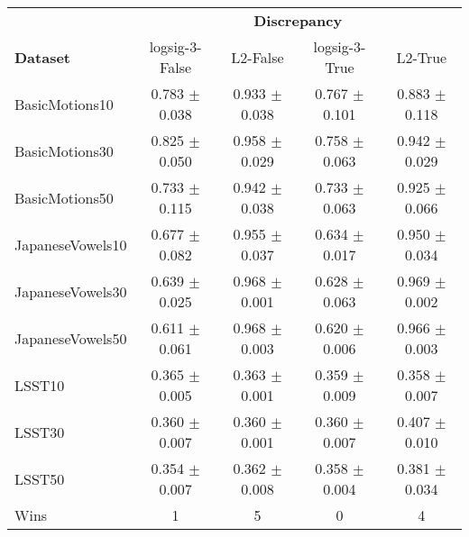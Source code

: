 \begin{tabular}{lcccc}
\toprule
{} & \multicolumn{4}{c}{\textbf{Discrepancy}} \\
\textbf{Dataset} &       logsig-3-False &           L2-False &      logsig-3-True &            L2-True \\
\midrule
BasicMotions10    &    0.783 $\pm$ 0.038 &  0.933 $\pm$ 0.038 &  0.767 $\pm$ 0.101 &  0.883 $\pm$ 0.118 \\
BasicMotions30    &    0.825 $\pm$ 0.050 &  0.958 $\pm$ 0.029 &  0.758 $\pm$ 0.063 &  0.942 $\pm$ 0.029 \\
BasicMotions50    &    0.733 $\pm$ 0.115 &  0.942 $\pm$ 0.038 &  0.733 $\pm$ 0.063 &  0.925 $\pm$ 0.066 \\
JapaneseVowels10  &    0.677 $\pm$ 0.082 &  0.955 $\pm$ 0.037 &  0.634 $\pm$ 0.017 &  0.950 $\pm$ 0.034 \\
JapaneseVowels30  &    0.639 $\pm$ 0.025 &  0.968 $\pm$ 0.001 &  0.628 $\pm$ 0.063 &  0.969 $\pm$ 0.002 \\
JapaneseVowels50  &    0.611 $\pm$ 0.061 &  0.968 $\pm$ 0.003 &  0.620 $\pm$ 0.006 &  0.966 $\pm$ 0.003 \\
LSST10            &    0.365 $\pm$ 0.005 &  0.363 $\pm$ 0.001 &  0.359 $\pm$ 0.009 &  0.358 $\pm$ 0.007 \\
LSST30            &    0.360 $\pm$ 0.007 &  0.360 $\pm$ 0.001 &  0.360 $\pm$ 0.007 &  0.407 $\pm$ 0.010 \\
LSST50            &    0.354 $\pm$ 0.007 &  0.362 $\pm$ 0.008 &  0.358 $\pm$ 0.004 &  0.381 $\pm$ 0.034 \\ 
\midrule
Wins &               1 &         5 &              0 &        4 \\
\bottomrule
\end{tabular}